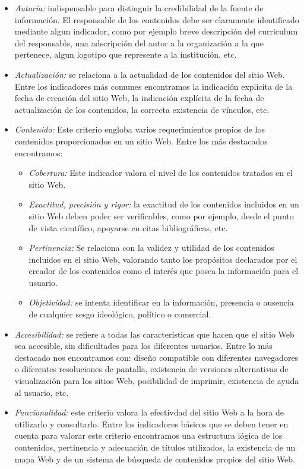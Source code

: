 \begin{itemize}
\item \emph{Autor\'ia:} indispensable para distinguir la credibilidad de la fuente de informaci\'on. El responsable de los contenidos debe ser claramente identificado mediante algun indicador, como por ejemplo breve descripci\'on del curriculum del responsable, una adscripci\'on del autor a la organizaci\'on a la que pertenece, algun logotipo que represente a la instituci\'on, etc.
\item \emph{Actualizaci\'on:} se relaciona a la actualidad de los contenidos del sitio Web. Entre los indicadores m\'as comunes encontramos la indicaci\'on expl\'icita de la fecha de creaci\'on del sitio Web, la indicaci\'on expl\'icita de la fecha de actualizaci\'on de los contenidos, la correcta existencia de v\'inculos, etc.
\item \emph{Contenido:} Este criterio engloba varios requerimientos propios de los contenidos proporcionados en un sitio Web. Entre los m\'as destacados encontramos:
\begin{itemize}
\item \emph{Cobertura:} Este indicador valora el nivel de los contenidos tratados en el sitio Web.
\item \emph{Exactitud, precisi\'on y rigor:} la exactitud de los contenidos incluidos en un sitio Web deben poder ser verificables, como por ejemplo, desde el punto de vista cient\'ifico, apoyarse en citas bibliogr\'aficas, etc.
\item \emph{Pertinencia:} Se relaciona con la validez y utilidad de los contenidos incluidos en el sitio Web, valorando tanto los prop\'ositos declarados por el creador de los contenidos como el inter\'es que posea la informaci\'on para el usuario.
\item \emph{Objetividad:} se intenta identificar en la informaci\'on, presencia o ausencia de cualquier sesgo ideol\'ogico, pol\'itico o comercial.
\end{itemize}
\item \emph{Accesibilidad:} se refiere a todas las caracter\'isticas que hacen que el sitio Web sea accesible, sin dificultades para los diferentes usuarios. Entre lo m\'as destacado nos encontramos con: dise\~no compatible con diferentes navegadores o diferentes resoluciones de pantalla, existencia de versiones alternativas de visualizaci\'on para los sitios Web, posibilidad de imprimir, existencia de ayuda al usuario, etc.
\item \emph{Funcionalidad:} este criterio valora  la efectivdad del sitio Web a la hora de utilizarlo y consultarlo. Entre los indicadores b\'asicos que se deben tener en cuenta para valorar este criterio encontramos una estructura l\'ogica de los contenidos, pertinencia y adecuaci\'on de t\'itulos utilizados, la existencia de un mapa Web y de un sistema de b\'usqueda de contenidos propios del sitio Web.

\end{itemize}
